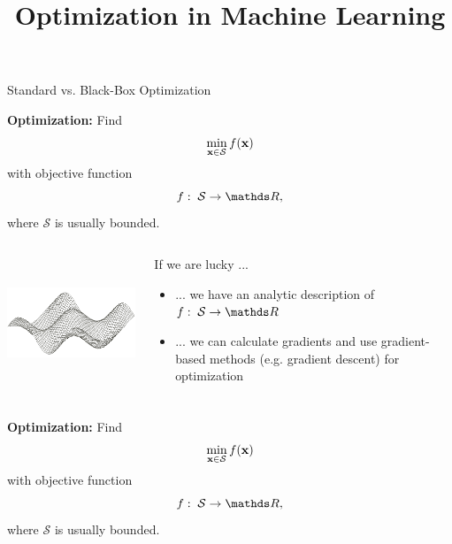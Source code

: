 \documentclass[11pt,compress,t,notes=noshow, xcolor=table]{beamer}
\title{Optimization in Machine Learning}
\date{}
\begin{document}

\begin{vbframe}{Standard vs. Black-Box Optimization}

\textbf{Optimization: } Find
$$
\min_{\mathbf{x} \in \mathcal{S}} f(\mathbf{x})
$$
with objective function  %
$$
f: \; \mathcal{S} \to \R,
$$
where $\mathcal{S}$ is usually bounded.

\lz 

\begin{columns}
\begin{column}{0.4\textwidth}
\begin{center}
\includegraphics[height = 4cm]{figure_man/Multimodal-example1.png}
\end{center}
\end{column}
\begin{column}{0.59\textwidth}
If we are lucky ... 
\begin{itemize}
\item ... we have an analytic description of $f: \; \mathcal{S} \to \R$
\item ... we can calculate gradients and use gradient-based methods (e.g. gradient descent) for optimization 
\end{itemize}
\end{column}
\end{columns}

\framebreak 

\textbf{Optimization: } Find
$$
\min_{\mathbf{x} \in \mathcal{S}} f(\mathbf{x})
$$
with objective function
$$
f: \; \mathcal{S} \to \R,
$$
where $\mathcal{S}$ is usually bounded.

\lz 


\end{vbframe}
\end{document}
